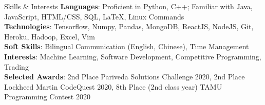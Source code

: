 \documentclass{resume} %
\begin{document}



\begin{rSection}{Skills \& Interests}
{\bf Languages}:
Proficient in Python, C++; Familiar with Java, JavaScript, HTML/CSS, SQL, LaTeX, Linux Commands\\
{\bf Technologies}:
Tensorflow, Numpy, Pandas, MongoDB, ReactJS, NodeJS, Git, Heroku, Hadoop, Excel, Vim\\
{\bf Soft Skills}:
Bilingual Communication (English, Chinese), Time Management\\
{\bf Interests}:
Machine Learning, Software Development, Competitive Programming, Trading\\
{\bf Selected Awards}:
2nd Place Pariveda Solutions Challenge 2020, 2nd Place Lockheed Martin CodeQuest 2020, 
8th Place (2nd class year) TAMU Programming Contest 2020
\end{rSection}
\end{document}
